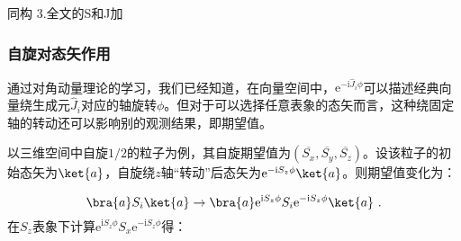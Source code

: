 
\begin{issues}
\issueDraft
同构
3.全文的S和J加\hat
\end{issues}

\subsubsection{自旋对态矢作用}
 通过对角动量理论的学习，我们已经知道，在向量空间中，$\mathrm e^{-\mathrm i\hat J_i\phi}$可以描述经典向量绕生成元$\hat J_i$对应的轴旋转$\phi$。但对于可以选择任意表象的态矢而言，这种绕固定轴的转动还可以影响别的观测结果，即期望值。

以三维空间中自旋$1/2$的粒子为例，其自旋期望值为$(\overline{S_x},\overline{S_y},\overline{S_z})$。设该粒子的初始态矢为$\ket{a}$，自旋绕$z$轴“转动”后态矢为$\mathrm e^{-\mathrm i S_z\phi}\ket{a}$。则期望值变化为：

\begin{equation}
\bra{a}S_i\ket{a}\rightarrow \bra{a}\mathrm e^{\mathrm i S_z\phi}S_i\mathrm e^{-\mathrm i S_z\phi}\ket{a}~.
\end{equation}
在$S_z$表象下计算$\mathrm e^{\mathrm i S_z\phi}S_x\mathrm e^{-\mathrm i S_z\phi}$得：

